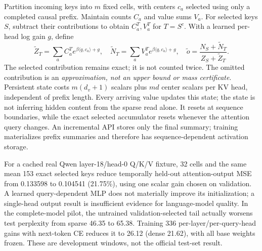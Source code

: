 \documentclass[11pt]{article}
\numberwithin{equation}{section}
\newcommand{\inner}[2]{\langle #1, #2\rangle}
\begin{document}
Partition incoming keys into $m$ fixed cells, with centers $c_a$ selected using only a completed causal
prefix. Maintain counts $C_a$ and value sums $V_a$. For selected keys $S$, subtract their contributions to
obtain $C_a^T,V_a^T$ for $T=S^c$. With a learned per-head log gain $g$, define
\begin{equation}\label{eq:tail-correction}
\widetilde Z_T=\sum_a C_a^T e^{\beta\inner{q}{c_a}+g},\quad
\widetilde N_T=\sum_a V_a^T e^{\beta\inner{q}{c_a}+g},\quad
\widetilde o=\frac{N_S+\widetilde N_T}{Z_S+\widetilde Z_T}.
\end{equation}
The selected contribution remains exact; it is not counted twice. The omitted contribution is an
\emph{approximation, not an upper bound or mass certificate}. Persistent state costs $m(d_v+1)$ scalars plus
$md$ center scalars per KV head, independent of prefix length. Every arriving value updates this state;
the state is not inferring hidden content from the sparse read alone. It resets at sequence boundaries,
while the exact selected accumulator resets whenever the attention query changes. An incremental API
stores only the final summary; training materializes prefix summaries and therefore has sequence-dependent
activation storage.

For a cached real Qwen layer-18/head-0 Q/K/V fixture, 32 cells and the same mean 153 exact selected keys
reduce temporally held-out attention-output MSE from 0.133598 to 0.104541 (21.75\%), using one scalar gain
chosen on validation. A learned query-dependent MLP does not materially improve its initialization; a
single-head output result is insufficient evidence for language-model quality. In the complete-model pilot,
the untrained validation-selected tail actually worsens test perplexity from sparse 46.35 to 65.38.
Training 336 per-layer/per-query-head gains with next-token CE reduces it to 26.12 (dense 21.62), with all
base weights frozen. These are development windows, not the official test-set result.
\end{document}

